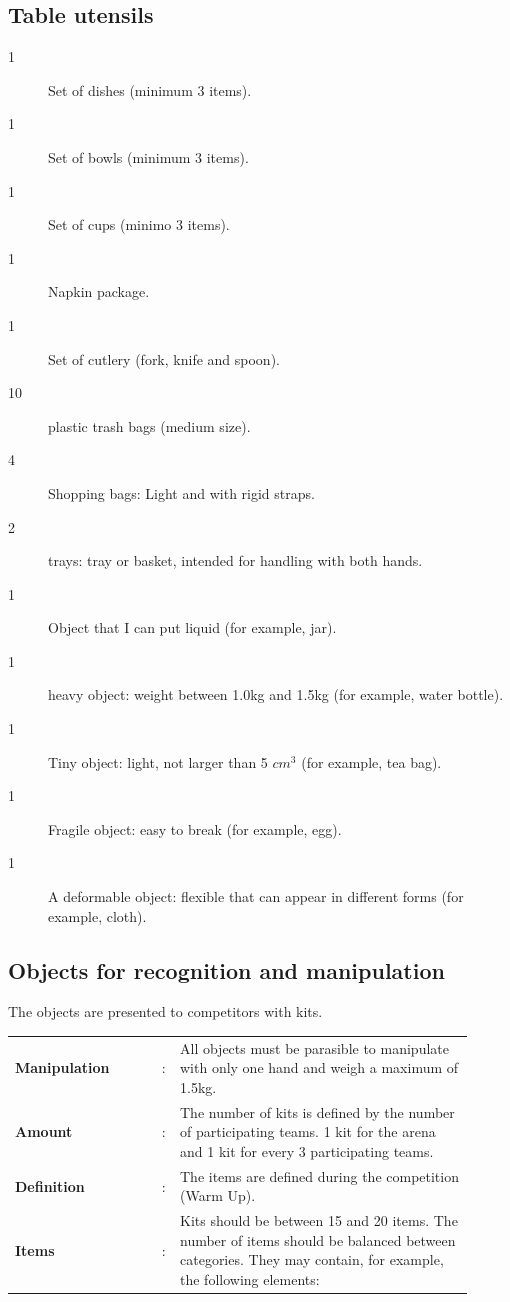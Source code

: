 \documentclass[11pt, twoside, openright, a4paper, chapterprefix]{article}
\begin{document}
\subsection{Table utensils}
\begin{description}
    \item [1] Set of dishes (minimum 3 items).
    \item [1] Set of bowls (minimum 3 items).
    \item [1] Set of cups (minimo 3 items).
    \item [1] Napkin package.
    \item [1] Set of cutlery (fork, knife and spoon).
    \item [10] plastic trash bags (medium size).
    \item [4] Shopping bags: Light and with rigid straps.
    \item [2] trays: tray or basket, intended for handling with both hands.
    \item [1] Object that I can put liquid (for example, jar).
    \item [1] heavy object: weight between 1.0kg and 1.5kg (for example, water bottle).
    \item [1] Tiny object: light, not larger than 5 $cm^3$ (for example, tea bag).
    \item [1] Fragile object: easy to break (for example, egg).
    \item [1] A deformable object: flexible that can appear in different forms (for example, cloth).
\end{description}

\subsection{Objects for recognition and manipulation}

The objects are presented to competitors with kits.

\begin{tabular}{ p{0.3\linewidth} p{0.01\linewidth} p{0.6\linewidth}}
    \textbf{Manipulation}       & : & All objects must be parasible to manipulate with only one hand and weigh a maximum of 1.5kg. \\
    \textbf{Amount}             & : & The number of kits is defined by the number of participating teams. 1 kit for the arena and 1 kit for every 3 participating teams. \\
    \textbf{Definition}         & : & The items are defined during the competition (Warm Up). \\
    \textbf{Items}              & : & Kits should be between 15 and 20 items. The number of items should be balanced between categories. They may contain, for example, the following elements: 
\end{tabular}
\end{document}
